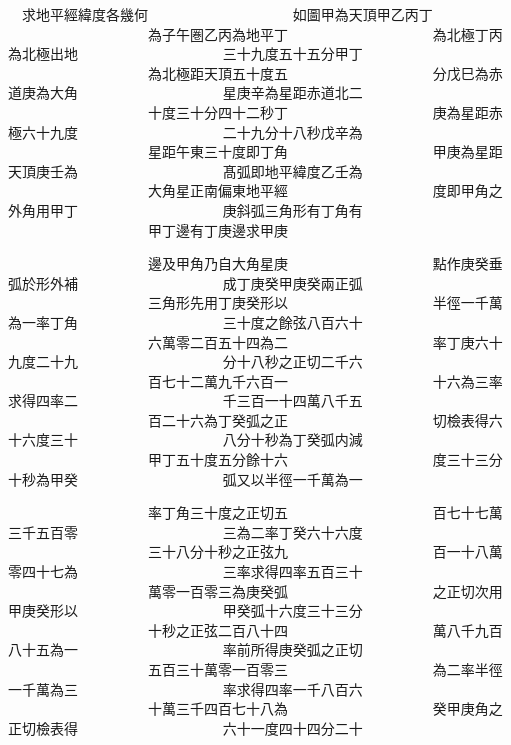 \begin{正文}
　求地平經緯度各㡬何
　　　　　　　　　　如圖甲為天頂甲乙丙丁
　　　　　　　　　　為子午圏乙丙為地平丁
　　　　　　　　　　為北極丁丙為北極出地
　　　　　　　　　　三十九度五十五分甲丁
　　　　　　　　　　為北極距天頂五十度五
　　　　　　　　　　分戊巳為赤道庚為大角
　　　　　　　　　　星庚辛為星距赤道北二
　　　　　　　　　　十度三十分四十二秒丁
　　　　　　　　　　庚為星距赤極六十九度
　　　　　　　　　　二十九分十八秒戊辛為
　　　　　　　　　　星距午東三十度即丁角
　　　　　　　　　　甲庚為星距天頂庚壬為
　　　　　　　　　　髙弧即地平緯度乙壬為
　　　　　　　　　　大角星正南偏東地平經
　　　　　　　　　　度即甲角之外角用甲丁
　　　　　　　　　　庚斜弧三角形有丁角有
　　　　　　　　　　甲丁邊有丁庚邊求甲庚
\par
\end{正文}\clearpage
{}
\begin{正文}
　　　　　　　　　　邊及甲角乃自大角星庚
　　　　　　　　　　點作庚癸垂弧於形外補
　　　　　　　　　　成丁庚癸甲庚癸兩正弧
　　　　　　　　　　三角形先用丁庚癸形以
　　　　　　　　　　半徑一千萬為一率丁角
　　　　　　　　　　三十度之餘弦八百六十
　　　　　　　　　　六萬零二百五十四為二
　　　　　　　　　　率丁庚六十九度二十九
　　　　　　　　　　分十八秒之正切二千六
　　　　　　　　　　百七十二萬九千六百一
　　　　　　　　　　十六為三率求得四率二
　　　　　　　　　　千三百一十四萬八千五
　　　　　　　　　　百二十六為丁癸弧之正
　　　　　　　　　　切檢表得六十六度三十
　　　　　　　　　　八分十秒為丁癸弧内減
　　　　　　　　　　甲丁五十度五分餘十六
　　　　　　　　　　度三十三分十秒為甲癸
　　　　　　　　　　弧又以半徑一千萬為一
\par
\end{正文}\clearpage
{}
\begin{正文}
　　　　　　　　　　率丁角三十度之正切五
　　　　　　　　　　百七十七萬三千五百零
　　　　　　　　　　三為二率丁癸六十六度
　　　　　　　　　　三十八分十秒之正弦九
　　　　　　　　　　百一十八萬零四十七為
　　　　　　　　　　三率求得四率五百三十
　　　　　　　　　　萬零一百零三為庚癸弧
　　　　　　　　　　之正切次用甲庚癸形以
　　　　　　　　　　甲癸弧十六度三十三分
　　　　　　　　　　十秒之正弦二百八十四
　　　　　　　　　　萬八千九百八十五為一
　　　　　　　　　　率前所得庚癸弧之正切
　　　　　　　　　　五百三十萬零一百零三
　　　　　　　　　　為二率半徑一千萬為三
　　　　　　　　　　率求得四率一千八百六
　　　　　　　　　　十萬三千四百七十八為
　　　　　　　　　　癸甲庚角之正切檢表得
　　　　　　　　　　六十一度四十四分二十
\par
\end{正文}\clearpage
